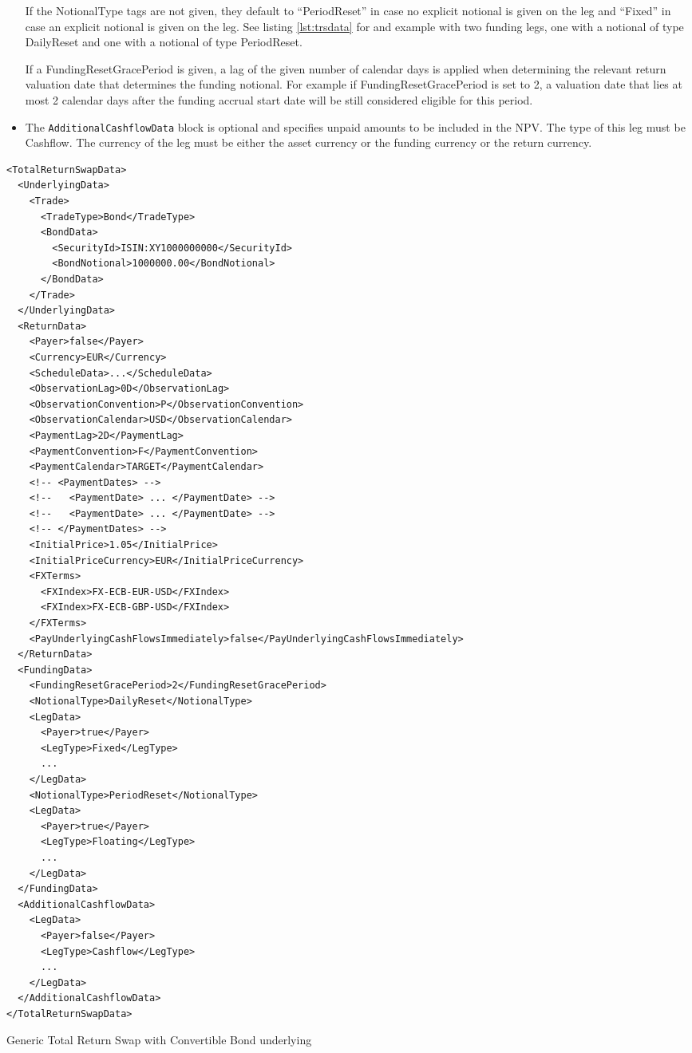 \begin{itemize}
  If the NotionalType tags are not given, they default to ``PeriodReset'' in case no explicit notional is given on the
  leg and ``Fixed'' in case an explicit notional is given on the leg. See listing \ref{lst:trsdata} for and example with
  two funding legs, one with a notional of type DailyReset and one with a notional of type PeriodReset.

  If a FundingResetGracePeriod is given, a lag of the given number of calendar days is applied when determining the
  relevant return valuation date that determines the funding notional. For example if FundingResetGracePeriod is set to
  2, a valuation date that lies at most 2 calendar days after the funding accrual start date will be still considered
  eligible for this period.

\item The {\tt AdditionalCashflowData} block is optional and specifies unpaid amounts to be included in the NPV. The
  type of this leg must be Cashflow. The currency of the leg must be either the asset currency or the funding currency
  or the return currency.
\end{itemize}

\begin{listing}[H]
\begin{verbatim}
<TotalReturnSwapData>
  <UnderlyingData>
    <Trade>
      <TradeType>Bond</TradeType>
      <BondData>
        <SecurityId>ISIN:XY1000000000</SecurityId>
        <BondNotional>1000000.00</BondNotional>
      </BondData>
    </Trade>
  </UnderlyingData>
  <ReturnData>
    <Payer>false</Payer>
    <Currency>EUR</Currency>
    <ScheduleData>...</ScheduleData>
    <ObservationLag>0D</ObservationLag>
    <ObservationConvention>P</ObservationConvention>
    <ObservationCalendar>USD</ObservationCalendar>
    <PaymentLag>2D</PaymentLag>
    <PaymentConvention>F</PaymentConvention>
    <PaymentCalendar>TARGET</PaymentCalendar>
    <!-- <PaymentDates> -->
    <!--   <PaymentDate> ... </PaymentDate> -->
    <!--   <PaymentDate> ... </PaymentDate> -->
    <!-- </PaymentDates> -->
    <InitialPrice>1.05</InitialPrice>
    <InitialPriceCurrency>EUR</InitialPriceCurrency>
    <FXTerms>
      <FXIndex>FX-ECB-EUR-USD</FXIndex>
      <FXIndex>FX-ECB-GBP-USD</FXIndex>
    </FXTerms>
    <PayUnderlyingCashFlowsImmediately>false</PayUnderlyingCashFlowsImmediately>
  </ReturnData>
  <FundingData>
    <FundingResetGracePeriod>2</FundingResetGracePeriod>
    <NotionalType>DailyReset</NotionalType>
    <LegData>
      <Payer>true</Payer>
      <LegType>Fixed</LegType>
      ...
    </LegData>
    <NotionalType>PeriodReset</NotionalType>
    <LegData>
      <Payer>true</Payer>
      <LegType>Floating</LegType>
      ...
    </LegData>
  </FundingData>
  <AdditionalCashflowData>
    <LegData>
      <Payer>false</Payer>
      <LegType>Cashflow</LegType>
      ...
    </LegData>
  </AdditionalCashflowData>
</TotalReturnSwapData>
\end{verbatim}
\caption{Generic Total Return Swap with Convertible Bond underlying}
\label{lst:trsdata}
\end{listing}

